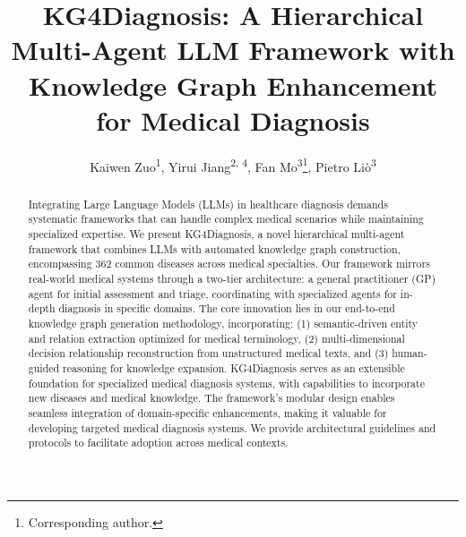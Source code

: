 \documentclass[letterpaper]{article} %
\title{KG4Diagnosis: A Hierarchical Multi-Agent LLM Framework with Knowledge Graph Enhancement for Medical Diagnosis}
\author{
Kaiwen Zuo\textsuperscript{\rm 1},
Yirui Jiang\textsuperscript{\rm 2, \rm4},
Fan Mo\textsuperscript{\rm 3}\thanks{Corresponding author.},
Pietro Liò\textsuperscript{\rm 3}
}
\begin{document}
\maketitle

\begin{abstract}
Integrating Large Language Models (LLMs) in healthcare diagnosis demands systematic frameworks that can handle complex medical scenarios while maintaining specialized expertise. We present KG4Diagnosis, a novel hierarchical multi-agent framework that combines LLMs with automated knowledge graph construction, encompassing 362 common diseases across medical specialties. Our framework mirrors real-world medical systems through a two-tier architecture: a general practitioner (GP) agent for initial assessment and triage, coordinating with specialized agents for in-depth diagnosis in specific domains. The core innovation lies in our end-to-end knowledge graph generation methodology, incorporating: (1) semantic-driven entity and relation extraction optimized for medical terminology, (2) multi-dimensional decision relationship reconstruction from unstructured medical texts, and (3) human-guided reasoning for knowledge expansion. KG4Diagnosis serves as an extensible foundation for specialized medical diagnosis systems, with capabilities to incorporate new diseases and medical knowledge. The framework's modular design enables seamless integration of domain-specific enhancements, making it valuable for developing targeted medical diagnosis systems. We provide architectural guidelines and protocols to facilitate adoption across medical contexts.
\end{abstract}

%
\end{document}
